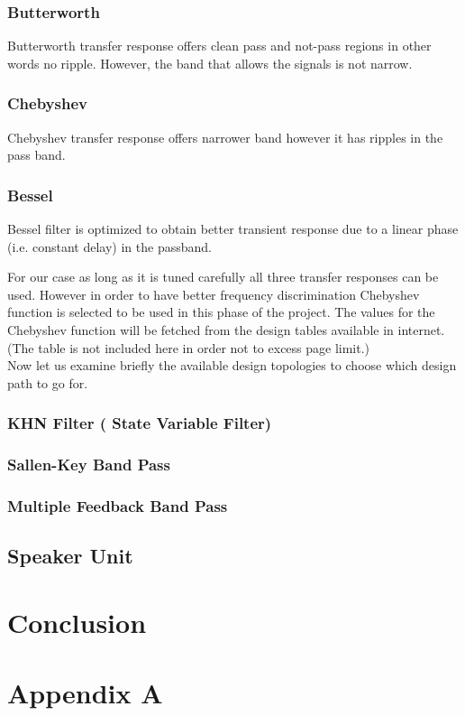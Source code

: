 \documentclass[letterpaper,12pt]{article}
\begin{document}
\subsubsection{Butterworth}
Butterworth transfer response offers clean pass and not-pass regions in other words no ripple. However, the band that allows the signals is not narrow.
\subsubsection{Chebyshev}
Chebyshev transfer response offers narrower band however it has ripples in the pass band.
\subsubsection{Bessel}
Bessel filter is optimized to obtain better transient response due to a linear phase (i.e.
constant delay) in the passband.

\vspace{4mm}
For our case as long as it is tuned carefully all three transfer responses can be used. However in order to have  better frequency discrimination Chebyshev function is selected to be used in this phase of the project. The values for the Chebyshev function will be fetched from the design tables available in internet. (The table is not included here in order not to excess page limit.)
\\

\vspace{4mm}
Now let us examine briefly the available design topologies to choose which design path to go for.
\subsubsection{KHN Filter ( State Variable Filter)}
\subsubsection{Sallen-Key Band Pass}
\subsubsection{Multiple Feedback Band Pass}



\subsection{Speaker Unit}

\section{Conclusion}
\section*{Appendix A}
\end{document}
